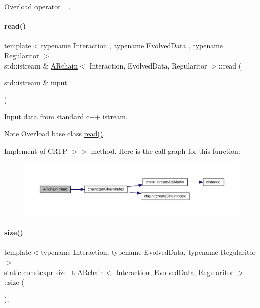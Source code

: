 Overload operator =. 

\mbox{\label{class_a_rchain_a86bd89bacf59c9c3bb0594499db82e04}} 
\paragraph{\texorpdfstring{read()}{read()}}
{\footnotesize\ttfamily template$<$typename Interaction , typename Evolved\+Data , typename Regularitor $>$ \\
std\+::istream \& \mbox{\hyperlink{class_a_rchain}{A\+Rchain}}$<$ Interaction, Evolved\+Data, Regularitor $>$\+::read (\begin{DoxyParamCaption}\item[{std\+::istream \&}]{input }\end{DoxyParamCaption})}



Input data from standard c++ istream. 

\begin{DoxyNote}{Note}
Overload base class \mbox{\hyperlink{class_a_rchain_a86bd89bacf59c9c3bb0594499db82e04}{read()}}.
\end{DoxyNote}
Implement of C\+R\+TP \textquotesingle{}$>$$>$\textquotesingle{} method. Here is the call graph for this function\+:\nopagebreak
\begin{figure}[H]
\begin{center}
\leavevmode
\includegraphics[width=350pt]{class_a_rchain_a86bd89bacf59c9c3bb0594499db82e04_cgraph}
\end{center}
\end{figure}
\mbox{\label{class_a_rchain_ac612af46ce057d56dc47a6d28738a4cf}} 
\paragraph{\texorpdfstring{size()}{size()}}
{\footnotesize\ttfamily template$<$typename Interaction, typename Evolved\+Data, typename Regularitor$>$ \\
static constexpr size\+\_\+t \mbox{\hyperlink{class_a_rchain}{A\+Rchain}}$<$ Interaction, Evolved\+Data, Regularitor $>$\+::size (\begin{DoxyParamCaption}{ }\end{DoxyParamCaption})\hspace{0.3cm}{\ttfamily [inline]}, {\ttfamily [static]}}



